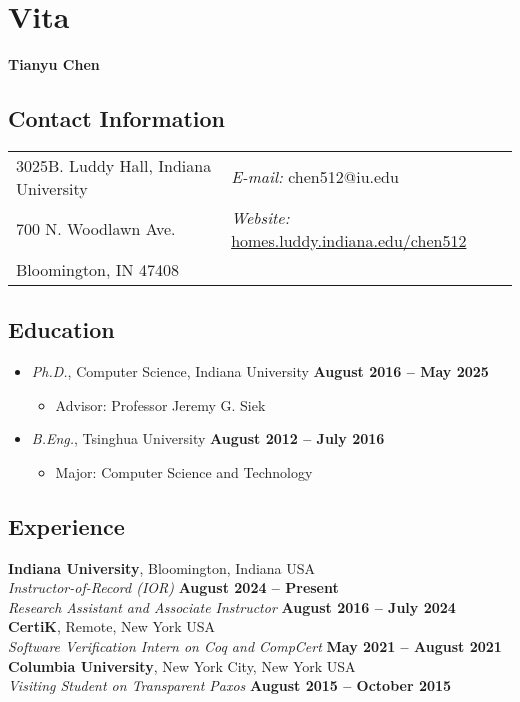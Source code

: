 \chapter*{Vita}

\doublespacing

\textbf{\Huge Tianyu Chen}


\section*{\sc Contact Information}
\vspace{.05in}
\begin{tabular}{@{}p{3in}p{3in}}
  3025B. Luddy Hall, Indiana University        & {\it E-mail:} chen512@iu.edu                          \\
  700 N. Woodlawn Ave.    & {\it Website:} \href{https://homes.luddy.indiana.edu/chen512/}{homes.luddy.indiana.edu/chen512}  \\
  Bloomington, IN 47408   &
\end{tabular}


\section*{\sc Education}

\begin{itemize}
\item {\em Ph.D.}, Computer Science, Indiana University \hfill {\bf August 2016 -- May 2025}
  \begin{itemize}
    \item Advisor: Professor Jeremy G. Siek
  \end{itemize}
\item {\em B.Eng.}, Tsinghua University \hfill {\bf August 2012 -- July 2016}
  \begin{itemize}
  \item Major: Computer Science and Technology
  \end{itemize}
\end{itemize}


\section*{\sc Experience}

{\bf Indiana University}, Bloomington, Indiana USA \\
{\em Instructor-of-Record (IOR)} \hfill {\bf August 2024 -- Present} \\
{\em Research Assistant and Associate Instructor} \hfill {\bf August 2016 -- July 2024} \\
{\bf CertiK}, Remote, New York USA \\
{\em Software Verification Intern on Coq and CompCert} \hfill {\bf May 2021 -- August 2021} \\
{\bf Columbia University}, New York City, New York USA \\
{\em Visiting Student on Transparent Paxos} \hfill {\bf August 2015 -- October 2015} \\


